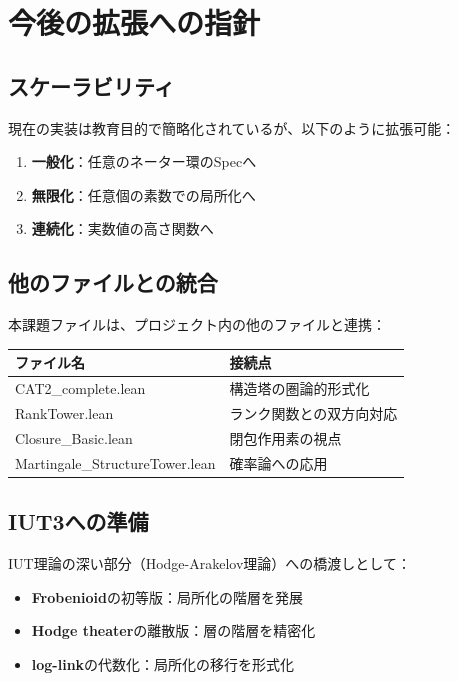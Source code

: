 \documentclass{ltjsarticle}
\begin{document}
\section{今後の拡張への指針}

\subsection{スケーラビリティ}

現在の実装は教育目的で簡略化されているが、以下のように拡張可能：

\begin{enumerate}
\item \textbf{一般化}：任意のネーター環のSpecへ
\item \textbf{無限化}：任意個の素数での局所化へ
\item \textbf{連続化}：実数値の高さ関数へ
\end{enumerate}

\subsection{他のファイルとの統合}

本課題ファイルは、プロジェクト内の他のファイルと連携：

\begin{center}
\begin{tabular}{|l|l|}
\hline
ファイル名 & 接続点 \\
\hline
CAT2\_complete.lean & 構造塔の圏論的形式化 \\
RankTower.lean & ランク関数との双方向対応 \\
Closure\_Basic.lean & 閉包作用素の視点 \\
Martingale\_StructureTower.lean & 確率論への応用 \\
\hline
\end{tabular}
\end{center}

\subsection{IUT3への準備}

IUT理論の深い部分（Hodge-Arakelov理論）への橋渡しとして：

\begin{itemize}
\item \textbf{Frobenioid}の初等版：局所化の階層を発展
\item \textbf{Hodge theater}の離散版：層の階層を精密化
\item \textbf{log-link}の代数化：局所化の移行を形式化
\end{itemize}
\end{document}
